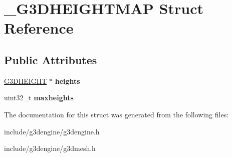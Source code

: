 \hypertarget{struct__G3DHEIGHTMAP}{}\section{\+\_\+\+G3\+D\+H\+E\+I\+G\+H\+T\+M\+AP Struct Reference}
\label{struct__G3DHEIGHTMAP}
\subsection*{Public Attributes}
\begin{DoxyCompactItemize}
\item 
\mbox{\label{struct__G3DHEIGHTMAP_adfc4dc35e0e7748f15735747f896467e}} 
\hyperlink{struct__G3DHEIGHT}{G3\+D\+H\+E\+I\+G\+HT} $\ast$ {\bfseries heights}
\item 
\mbox{\label{struct__G3DHEIGHTMAP_aed26d161356f93d6ce2aaa1fad9c7b0d}} 
uint32\+\_\+t {\bfseries maxheights}
\end{DoxyCompactItemize}


The documentation for this struct was generated from the following files\+:\begin{DoxyCompactItemize}
\item 
include/g3dengine/g3dengine.\+h\item 
include/g3dengine/g3dmesh.\+h\end{DoxyCompactItemize}
